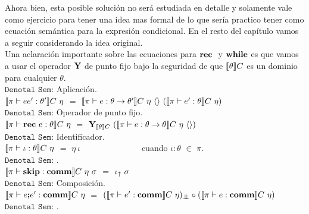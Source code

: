 Ahora bien, esta posible soluci\'on no ser\'a estudiada en detalle y solamente
vale como ejercicio para tener una idea mas formal de lo que ser\'ia practico
tener como ecuaci\'on sem\'antica para la expresi\'on condicional. En el resto 
del cap\'itulo vamos a seguir considerando la idea original.\\

Una aclaraci\'on importante sobre las ecuaciones para $\textbf{rec} \ $ y $\textbf{while}{}{}$
es que vamos a usar el operador $\textbf{Y}$ de punto fijo bajo la seguridad de que
$\llbracket \theta \rrbracket C$ es un dominio para cualquier $\theta$.\\

\noindent
$\texttt{Denotal Sem:}$ Aplicaci\'on.\\

$\semBrcks{ \pi \vdash ee' : \theta' }C \ \eta$ 
$=$ 
$\llbracket  \pi \vdash e : \theta \rightarrow \theta'  \rrbracket C \ \eta \ \langle  \rangle \
(\llbracket  \pi \vdash e' : \theta  \rrbracket C \ \eta)$\\

\noindent
$\texttt{Denotal Sem:}$ Operador de punto fijo.\\

$\semBrcks{ \pi \vdash \rec e : \theta}C \ \eta$ 
$=$ 
$\Y_{\semBrcks{\theta}C} \ 
(\semBrcks{ \pi \vdash e : \theta \rightarrow \theta}C \ \eta \ \lrangles{})$\\

\noindent
$\texttt{Denotal Sem:}$ Identificador.\\

$\semBrcks{ \pi \vdash \iota : \theta }C \ \eta$ $=$ $\eta \ \iota$
\ \ \ \ \ \ \ \ \ \ \ \ \ \ cuando $\iota:\theta$ $\in$ $\pi$.\\

\noindent
$\texttt{Denotal Sem:}$ \cskip.\\

$\semBrcks{ \pi \vdash \cskip : \commt }C \ \eta \ \sigma$ $=$ $\iota_{\uparrow} \ \sigma$\\

\noindent
$\texttt{Denotal Sem:}$ Composici\'on.\\

$\llbracket  \pi \vdash e \textbf{;} e' : \textbf{comm}  \rrbracket C \ \eta$ 
$=$ 
$(\semBrcks{\pi \vdash e' : \commt}C \ \eta)_{\dbot}
\circ
(\semBrcks{ \pi \vdash e : \commt}C \ \eta)$\\

\noindent
$\texttt{Denotal Sem:}$ \cwhile.\\

